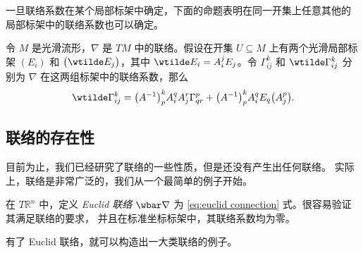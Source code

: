 一旦联络系数在某个局部标架中确定，下面的命题表明在同一开集上任意其他的
局部标架中的联络系数也可以确定。

\begin{proposition}[联络系数的变换法则]
  令 $M$ 是光滑流形，$\nabla$ 是 $TM$ 中的联络。假设在开集 $U\subseteq M$
  上有两个光滑局部标架 $(E_i)$ 和 $\bigl(\wtilde E_j\bigr)$，其中
  $\wtilde E_i=A_i^jE_j$。令 $\Gamma_{ij}^k$ 和 $\wtilde\Gamma_{ij}^k$
  分别为 $\nabla$ 在这两组标架中的联络系数，那么 
  \begin{equation}
    \wtilde \Gamma_{ij}^k=\bigl(A^{-1}\bigr)_p^kA_i^qA_j^r\Gamma_{qr}^p
    +\bigl(A^{-1}\bigr)_p^kA_i^qE_q\bigl(A_j^p\bigr).
  \end{equation}
\end{proposition}

\subsection{联络的存在性}

目前为止，我们已经研究了联络的一些性质，但是还没有产生出任何联络。
实际上，联络是非常广泛的，我们从一个最简单的例子开始。

\begin{example}[Euclid 联络]
  在 $T \mathbb{R}^n$ 中，定义 \emph{Euclid 联络} $\wbar\nabla$ 为
  \eqref{eq:euclid connection} 式。很容易验证其满足联络的要求，
  并且在标准坐标标架中，其联络系数均为零。
\end{example}

有了 Euclid 联络，就可以构造出一大类联络的例子。

